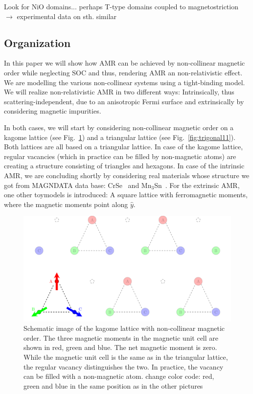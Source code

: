 \documentclass[prb,showpacs,amsmath,amssymb,superscriptaddress,twocolumn,floatfix]{revtex4-1}
\begin{document}
{\color{red} Look for NiO domains... perhaps T-type domains coupled to magnetostriction $\rightarrow$ experimental data on sth. similar}

\subsection{Organization}

In this paper we will show how AMR can be achieved by non-collinear magnetic order while neglecting SOC and thus, rendering AMR an non-relativistic effect. We are modelling the various non-collinear systems using a tight-binding model. We will realize non-relativistic AMR in two different ways: Intrinsically, thus scattering-independent, due to an anisotropic Fermi surface and extrinsically by considering magnetic impurities.  

In both cases, we will start by considering non-collinear magnetic order on a kagome lattice (see Fig.~\ref{fig:kagome11}) and a triangular lattice (see Fig.~\ref{fig:trigonal11}). Both lattices are all based on a triangular lattice. In case of the kagome lattice, regular vacancies (which in practice can be filled by non-magnetic atoms) are creating a structure consisting of triangles and hexagons. In case of the intrinsic AMR, we are concluding shortly by considering real materials whose structure we got from MAGNDATA data base: CrSe~\cite{Magndata:CrSe} and Mn$_3$Sn~\cite{Magndata:Mn3Sn}. For the extrinsic AMR, one other toymodels is introduced: A square lattice with ferromagnetic moments, where the magnetic moments point along $\hat{y}$.

\begin{figure}
	\centering
	\includegraphics[width=0.7\linewidth]{img/Kagome_11}
	\caption{Schematic image of the kagome lattice with non-collinear magnetic order. The three magnetic moments in the magnetic unit cell are shown in red, green and blue. The net magnetic moment is zero. While the magnetic unit cell is the same as in the triangular lattice, the regular vacancy distinguishes the two. In practice, the vacancy can be filled with a non-magnetic atom. {\color{red} change color code: red, green and blue in the same position as in the other pictures } }
	\label{fig:kagome11}
\end{figure}
\end{document}
